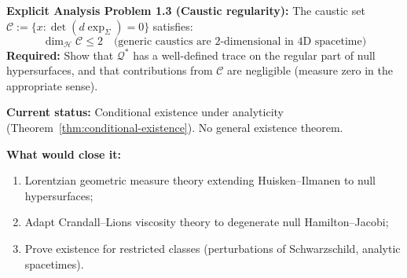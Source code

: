 \begin{remark}
\textbf{Explicit Analysis Problem 1.3 (Caustic regularity):}
The caustic set $\mathcal{C} := \{x : \det(d\exp_\Sigma) = 0\}$ satisfies:
$$\dim_{\mathcal{H}} \mathcal{C} \leq 2 \quad \text{(generic caustics are 2-dimensional in 4D spacetime)}$$
\textbf{Required:} Show that $\mathcal{Q}^*$ has a well-defined trace on the regular part of null hypersurfaces, and that contributions from $\mathcal{C}$ are negligible (measure zero in the appropriate sense).

\textbf{Current status:} Conditional existence under analyticity (Theorem~\ref{thm:conditional-existence}). No general existence theorem.

\textbf{What would close it:} 
\begin{enumerate}[label=(\alph*)]
\item Lorentzian geometric measure theory extending Huisken--Ilmanen to null hypersurfaces;
\item Adapt Crandall--Lions viscosity theory to degenerate null Hamilton--Jacobi;
\item Prove existence for restricted classes (perturbations of Schwarzschild, analytic spacetimes).
\end{enumerate}
\end{remark}

